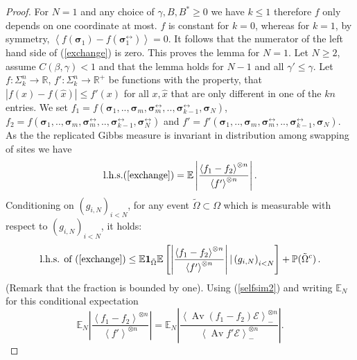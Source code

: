 \documentclass[a4paper,12pt,oneside,reqno]{amsart}
\numberwithin{equation}{section}
\begin{document}
\begin{proof}
For $N=1$ and any choice of $\gamma,B,B^*\geq 0$ we have $k\leq 1$ therefore $f$ only depends on one coordinate at most. $f$ is constant for $k=0$, whereas for $k=1$, by symmetry, $\left<f \left(\boldsymbol{\sigma}_1\right)-f\left(\boldsymbol{\sigma}^{\leftrightarrow}_1\right)\right> = 0$. It follows that the numerator of the left hand side of (\ref{exchange}) is zero. This proves the lemma for $N=1$. Let $N \geq 2$, assume $C({\beta},\gamma)<1$ and that the lemma holds for $N-1$ and all $\gamma'\leq \gamma$. Let $f:\Sigma_k^n \rightarrow {\mathbb{R}}$, $f':\Sigma_k^n \rightarrow {\mathbb{R}}^+$ be functions with the property, that $|f(x)-f(\hat x)| \leq f'(x)$ for all $x,\hat x$ that are only different in one of the $k n$ entries. We set $f_1= f \left(\boldsymbol{\sigma}_1,..,\boldsymbol{\sigma}_m,\boldsymbol{\sigma}^{\leftrightarrow}_{m},..,\boldsymbol{\sigma}^{\leftrightarrow}_{k-1},\boldsymbol{\sigma}_{N}\right)$, $f_2 = f\left(\boldsymbol{\sigma}_1,..,\boldsymbol{\sigma}_m,\boldsymbol{\sigma}^{\leftrightarrow}_{m},..,\boldsymbol{\sigma}^{\leftrightarrow}_{k-1},\boldsymbol{\sigma}^{\leftrightarrow}_{N}\right)$ and $f'= f'\left(\boldsymbol{\sigma}_1,..,\boldsymbol{\sigma}_m,\boldsymbol{\sigma}^{\leftrightarrow}_{m},..,\boldsymbol{\sigma}^{\leftrightarrow}_{k-1},\boldsymbol{\sigma}_{N}\right)$. As the the replicated Gibbs measure is invariant in distribution among swapping of sites we have 
\[
\mbox{l.h.s.} (\ref{exchange}) = {{\mathbb{E}}}\left|\frac{\left<f_1-f_2 \right>^{\otimes n}}{\left<f' \right>^{\otimes n}}\right|.
\]
Conditioning on $(g_{i,N})_{i< N}$, for any  event $\tilde  \Omega \subset \Omega$ which is measurable with respect to $\left(g_{i,N}\right)_{i<N}$, it holds: 
\begin{equation}\label{omegadecomp}\text{l.h.s. of } (\ref{exchange}) \leq {{\mathbb{E}}}\textbf{1}_{\tilde \Omega}{{\mathbb{E}}}\left[\left|\frac{\left<f_1-f_2 \right>^{\otimes n}}{\left<f'\right>^{\otimes n}}\right| |\left(g_{i,N}\right)_{i<N} \right] + {\mathbb{P}}(\tilde  \Omega^c)\,.
\end{equation}
(Remark that the fraction is bounded by one). Using (\ref{selfsim2}) and writing ${{\mathbb{E}}}_{N}$ for this conditional expectation 
\begin{equation}\label{selfsimexpec}{{\mathbb{E}}}_{N}\left|\frac{\left<f_1-f_2 \right>^{\otimes n}}{\left<f' \right>^{\otimes n}}\right| = {{\mathbb{E}}}_{N}\left|\frac{\left<\operatorname{Av} \left(f_1-f_2\right) \mathcal{E}\right>_{-}^{\otimes n}}{\left<\operatorname{Av} f' \mathcal{E}\right>_{-}^{\otimes n}}\right|. 
\end{equation}

\end{proof}
\end{document}
